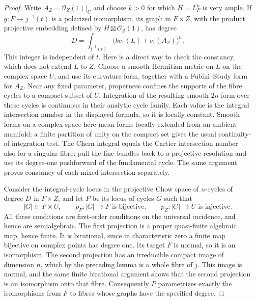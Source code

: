 \begin{proof}
Write $A_Z=\mathcal{O}_Z(1)|_U$ and choose $k>0$ for which $H=L_F^k$ is very ample.  If $g:F\to j^{-1}(t)$ is a polarized isomorphism, its graph in $F\times Z$, with the product projective embedding defined by $H\boxtimes\mathcal{O}_Z(1)$, has degree
\begin{equation}
 D=\int_{j^{-1}(t)}
                \bigl(kc_1(L)+c_1(A_Z)\bigr)^n.
 \label{eq:cmp-graph-degree}
\end{equation}
This integer is independent of $t$.  Here is a direct way to check the constancy, which does not extend $L$ to $Z$.  Choose a smooth Hermitian metric on $L$ on the complex space $U$, and use its curvature form, together with a Fubini--Study form for $A_Z$.  Near any fixed parameter, properness confines the supports of the fibre cycles to a compact subset of $U$.  Integration of the resulting smooth $2n$-form over these cycles is continuous in their analytic cycle family.  Each value is the integral intersection number in the displayed formula, so it is locally constant.  Smooth forms on a complex space here mean forms locally extended from an ambient manifold; a finite partition of unity on the compact set gives the usual continuity-of-integration test.  The Chern integral equals the Cartier intersection number also for a singular fibre: pull the line bundles back to a projective resolution and use its degree-one pushforward of the fundamental cycle.  The same argument proves constancy of each mixed intersection separately.

Consider the integral-cycle locus in the projective Chow space of $n$-cycles of degree $D$ in $F\times Z$, and let $P$ be its locus of cycles $G$ such that
\[
 |G|\subset F\times U,\qquad
 p_F:|G|\to F\text{ is bijective},\qquad
 p_Z:|G|\to U\text{ is injective}.
\]
All three conditions are first-order conditions on the universal incidence, and hence are semialgebraic.  The first projection is a proper quasi-finite algebraic map, hence finite.  It is birational, since in characteristic zero a finite map bijective on complex points has degree one.  Its target $F$ is normal, so it is an isomorphism.  The second projection has an irreducible compact image of dimension $n$, which by the preceding lemma is a whole fibre of $j$.  This image is normal, and the same finite birational argument shows that the second projection is an isomorphism onto that fibre. Consequently $P$ parametrizes exactly the isomorphisms from $F$ to fibres whose graphs have the specified degree.


\end{proof}
